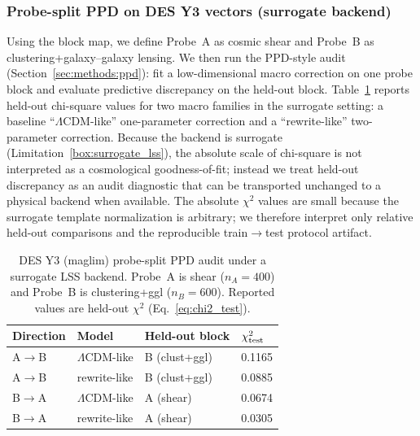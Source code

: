 \documentclass[11pt]{article}
\theoremstyle{definition}
\theoremstyle{plain}
\theoremstyle{remark}
\begin{document}
\subsubsection{Probe-split PPD on DES Y3 vectors (surrogate backend)}\label{sec:results:lss_ppd}
Using the block map, we define Probe~A as cosmic shear and Probe~B as clustering+galaxy--galaxy lensing.
We then run the PPD-style audit (Section~\ref{sec:methods:ppd}): fit a low-dimensional macro correction on one probe block and evaluate predictive discrepancy on the held-out block.
Table~\ref{tab:lss_ppd_y3} reports held-out chi-square values for two macro families in the surrogate setting: a baseline ``$\Lambda$CDM-like'' one-parameter correction and a ``rewrite-like'' two-parameter correction.
Because the backend is surrogate (Limitation~\ref{box:surrogate_lss}), the absolute scale of chi-square is not interpreted as a cosmological goodness-of-fit; instead we treat held-out discrepancy as an audit diagnostic that can be transported unchanged to a physical backend when available.
The absolute $\chi^2$ values are small because the surrogate template normalization is arbitrary; we therefore interpret only relative held-out comparisons and the reproducible train$\to$test protocol artifact.

\begin{table}[t]
\centering
\caption{DES Y3 (maglim) probe-split PPD audit under a surrogate LSS backend. Probe~A is shear ($n_A=400$) and Probe~B is clustering+ggl ($n_B=600$). Reported values are held-out $\chi^2$ (Eq.~\eqref{eq:chi2_test}).}
\label{tab:lss_ppd_y3}
\begin{tabular}{@{}llll@{}}
\toprule
Direction & Model & Held-out block & $\chi^2_{\rm test}$ \\
\midrule
A$\to$B & $\Lambda$CDM-like & B (clust+ggl) & 0.1165 \\
A$\to$B & rewrite-like & B (clust+ggl) & 0.0885 \\
B$\to$A & $\Lambda$CDM-like & A (shear) & 0.0674 \\
B$\to$A & rewrite-like & A (shear) & 0.0305 \\
\bottomrule
\end{tabular}
\end{table}
\end{document}
